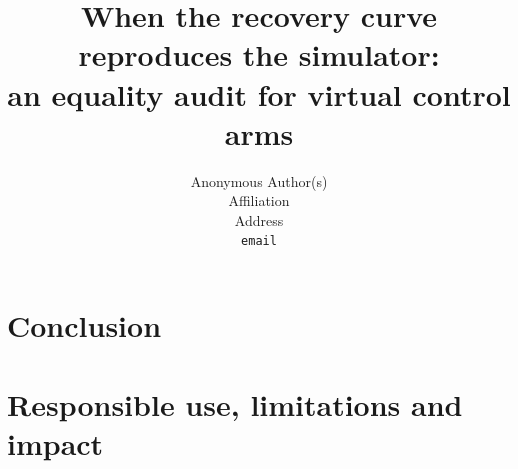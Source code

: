\documentclass{article}
\title{When the recovery curve reproduces the simulator:\\
an equality audit for virtual control arms}
\author{%
  Anonymous Author(s) \\
  Affiliation \\
  Address \\
  \texttt{email} \\
}
\begin{document}
\maketitle









\section{Conclusion}
\label{sec:conclusion}



\section{Responsible use, limitations and impact}
\label{sec:responsible}






\clearpage


\end{document}
